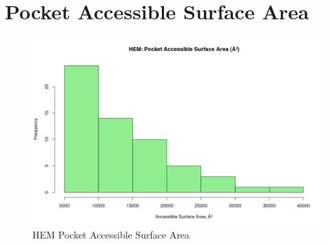 \section{Pocket Accessible Surface Area}
	\begin{figure}
		\caption{HEM Pocket Accessible Surface Area}
		\label{figs:HEM_pocketAccSA}
		\includegraphics[width=\linewidth]{7A/HEM_pocketAccSA}
	\end{figure}


